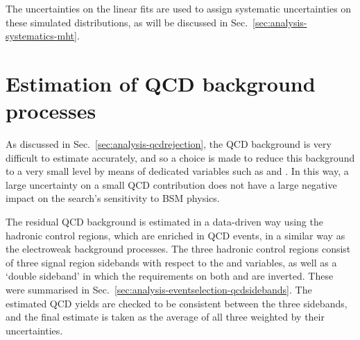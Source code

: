 The uncertainties on the linear fits are used to assign systematic 
uncertainties on these simulated \mht distributions, as will be discussed in 
Sec.~\ref{sec:analysis-systematics-mht}.

\section{Estimation of QCD background processes}
\label{sec:analysis-estimation-qcd}
As discussed in Sec.~\ref{sec:analysis-qcdrejection}, the QCD background is 
very difficult to estimate accurately, and so a choice is made to reduce this 
background to a very small level by means of dedicated variables such as 
\alphat and \bdphi. In this way, a large uncertainty on a small QCD 
contribution does not have a large negative impact on the search's sensitivity 
to BSM physics. 

The residual QCD background is estimated in a data-driven way using the 
hadronic control regions, which are enriched in QCD events, in a similar way as 
the electroweak background processes. The three hadronic control regions 
consist of three signal region sidebands with respect to the \mhtmet and \bdphi 
variables, as well as a `double sideband' in which the requirements on both 
\mhtmet and \bdphi are inverted. These were summarised in 
Sec.~\ref{sec:analysis-eventselection-qcdsidebands}. The estimated QCD yields 
are checked to be consistent between the three sidebands, and the final 
estimate is taken as the average of all three weighted by their uncertainties.

